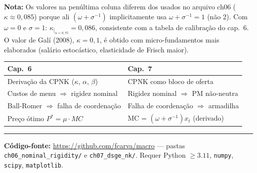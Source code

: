 \documentclass[12pt, a4paper]{article}
\begin{document}
\noindent\textbf{Nota:} Os valores na penúltima coluna diferem dos usados no arquivo ch06
($\kappa \approx 0{,}085$) porque ali $(\omega + \sigma^{-1})$ implicitamente usa
$\omega + \sigma^{-1} = 1$ (não 2). Com $\omega = 0$ e $\sigma = 1$:
$\kappa_{|_{\alpha=0{,}75}} = 0{,}086$, consistente com a tabela de calibração do cap.\ 6.
O valor de Galí (2008), $\kappa = 0{,}1$, é obtido com micro-fundamentos mais
elaborados (salário estocástico, elasticidade de Frisch maior).

\vspace{1em}
\begin{formulabox}[title={Conexão entre os dois capítulos}]
\begin{center}
\begin{tabular}{ll}
\toprule
Cap.\ 6 & Cap.\ 7 \\
\midrule
Derivação da CPNK ($\kappa$, $\alpha$, $\beta$) & CPNK como bloco de oferta \\
Custos de menu $\Rightarrow$ rigidez nominal & Rigidez nominal $\Rightarrow$ PM não-neutra \\
Ball-Romer $\Rightarrow$ falha de coordenação & Falha de coordenação $\Rightarrow$ armadilha \\
Preço ótimo $P^* = \mu\cdot MC$ & MC = $(\omega+\sigma^{-1})x_t$ (derivado) \\
\bottomrule
\end{tabular}
\end{center}
\end{formulabox}

\bigskip
\hrule
\vspace{1em}
{\footnotesize
\textbf{Código-fonte:} \url{https://github.com/fcarva/macro} ---
pastas \texttt{ch06\_nominal\_rigidity/} e \texttt{ch07\_dsge\_nk/}.
Requer Python $\geq 3.11$, \texttt{numpy}, \texttt{scipy}, \texttt{matplotlib}.
}
\end{document}
